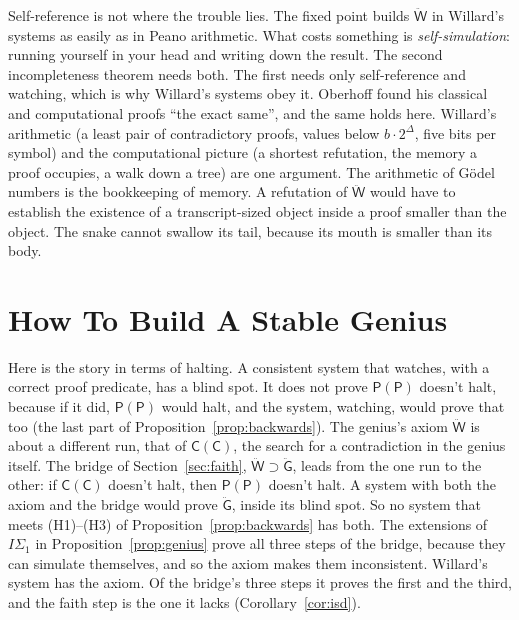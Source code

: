 \documentclass[11pt]{article}
\newcommand{\G}{\ddot{\mathsf{G}}}          %
\newcommand{\W}{\ddot{\mathsf{W}}}          %
\newcommand{\Prog}[1]{\mathsf{#1}}
\newcommand{\fs}[1]{\ifmmode\text{\guillemotleft#1\guillemotright}\else\guillemotleft#1\guillemotright\fi}
\theoremstyle{plain}
\theoremstyle{definition}
\begin{document}
Self-reference is not where the trouble lies. The fixed point builds $\W$ in
Willard's systems as easily as in Peano arithmetic. What costs something is
\emph{self-simulation}: running yourself in your head and writing down the
result. The second incompleteness theorem needs both. The first needs only
self-reference and watching, which is why Willard's systems obey it.
Oberhoff found his classical and computational proofs ``the exact same'', and
the same holds here. Willard's arithmetic (a least pair of contradictory
proofs, values below $b \cdot 2^\Delta$, five bits per symbol) and the
computational picture (a shortest refutation, the memory a proof occupies, a
walk down a tree) are one argument. The arithmetic of Gödel numbers is the
bookkeeping of memory. A refutation of $\W$ would have to establish the
existence of a transcript-sized object inside a proof smaller than the
object. The snake cannot swallow its tail, because its mouth is smaller than
its body.

\section{How To Build A Stable Genius}
\label{sec:build}

Here is the story in terms of halting. A consistent system that watches,
with a correct proof predicate, has a blind spot. It does not prove
\fs{$\Prog{P}(\Prog{P})$ doesn't halt}, because if it did,
$\Prog{P}(\Prog{P})$ would halt, and the system, watching, would prove that
too (the last part of Proposition~\ref{prop:backwards}). The genius's axiom
$\W$ is about a different run, that of $\Prog{C}(\Prog{C})$, the search for
a contradiction in the genius itself. The bridge of Section~\ref{sec:faith},
$\W \supset \G$, leads from the one run to the other: if
$\Prog{C}(\Prog{C})$ doesn't halt, then $\Prog{P}(\Prog{P})$ doesn't halt.
A system with both the axiom and the bridge would prove $\G$, inside its
blind spot. So no system that meets (H1)--(H3) of
Proposition~\ref{prop:backwards} has both. The extensions of $I\Sigma_1$ in
Proposition~\ref{prop:genius} prove all three steps of the bridge, because
they can simulate themselves, and so the axiom makes them inconsistent.
Willard's system has the axiom. Of the bridge's three steps it proves the
first and the third, and the faith step is the one it lacks
(Corollary~\ref{cor:isd}).
\end{document}

